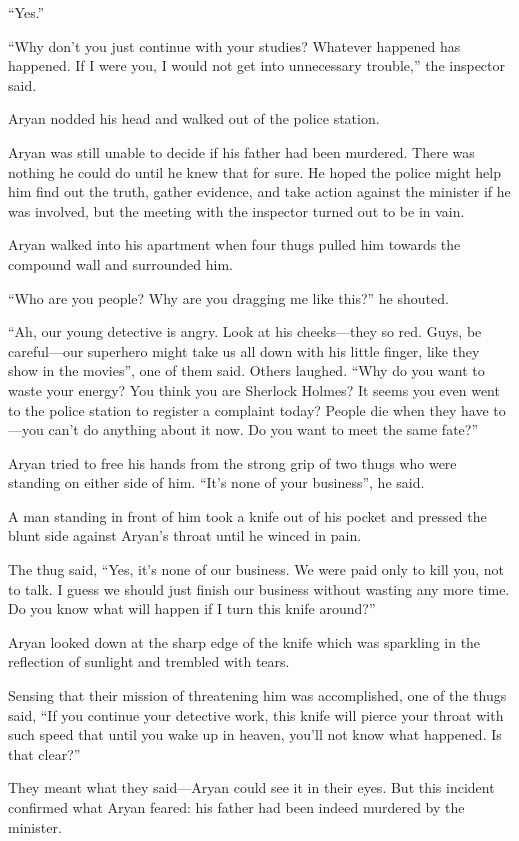 “Yes.”

“Why don't you just continue with your studies? Whatever happened has happened.
If I were you, I would not get into unnecessary trouble,” the inspector said.

Aryan nodded his head and walked out of the police station.

Aryan was still unable to decide if his father had been murdered. There was nothing
he could do until he knew that for sure. He hoped the police might help him find
out the truth, gather evidence, and take action against the minister if he was
involved, but the meeting with the inspector turned out to be in vain.

Aryan walked into his apartment when four thugs pulled him towards the compound
wall and surrounded him.

“Who are you people? Why are you dragging me like this?” he shouted.

“Ah, our young detective is angry. Look at his cheeks—they so red. Guys, be
careful—our superhero might take us all down with his little finger, like
they show in the movies”, one of them said. Others laughed. “Why do you want to
waste your energy? You think you are Sherlock Holmes? It seems you even went to
the police station to register a complaint today? People die when they have
to—you can't do anything about it now. Do you want to meet the same fate?”

Aryan tried to free his hands from the strong grip of two thugs who were
standing on either side of him. “It's none of your business”, he said.

A man standing in front of him took a knife out of his pocket and pressed the
blunt side against Aryan's throat until he winced in pain.

The thug said, “Yes, it's none of our business. We were paid only to kill you,
not to talk. I guess we should just finish our business without wasting any more
time. Do you know what will happen if I turn this knife around?”

Aryan looked down at the sharp edge of the knife which was sparkling in the
reflection of sunlight and trembled with tears.

Sensing that their mission of threatening him was accomplished, one of the thugs
said, “If you continue your detective work, this knife will pierce your
throat with such speed that until you wake up in heaven, you'll not know what
happened. Is that clear?”

They meant what they said—Aryan could see it in their eyes. But this incident
confirmed what Aryan feared: his father had been indeed murdered by the minister.